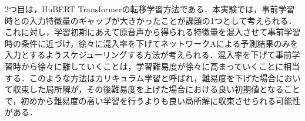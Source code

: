 2つ目は，HuBERT Transformerの転移学習方法である．本実験では，事前学習時との入力特徴量のギャップが大きかったことが課題の1つとして考えられる．これに対し，学習初期にあえて原音声から得られる特徴量を混入させて事前学習時の条件に近づけ，徐々に混入率を下げてネットワークAによる予測結果のみを入力とするようスケジューリングする方法が考えられる．混入率を下げて事前学習時から徐々に離していくことは，学習難易度が徐々に高まっていくことに相当する．このような方法はカリキュラム学習と呼ばれ，難易度を下げた場合において収束した局所解が，その後難易度を上げた場合における良い初期値となることで，初めから難易度の高い学習を行うよりも良い局所解に収束させられる可能性がある\cite{wang2021survey}．
